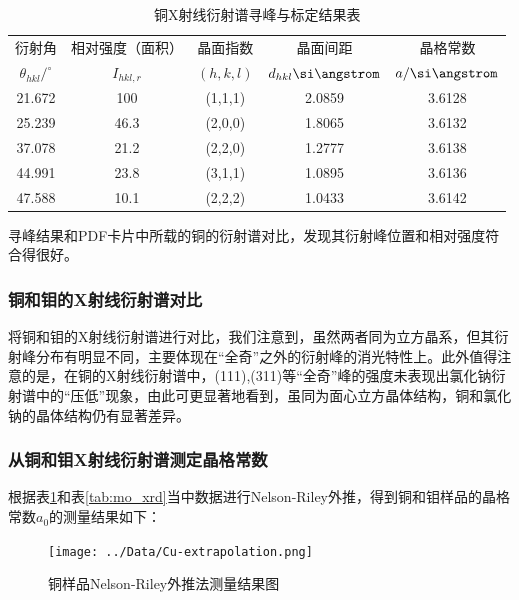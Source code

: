 \documentclass{thuemp}
\begin{document}
\begin{table}
    \centering
    \captionnamefont{\wuhao\bf\heiti}
    \captiontitlefont{\wuhao\bf\heiti}
    \caption{铜X射线衍射谱寻峰与标定结果表}
    \label{tab:cu_xrd}
    \liuhao
    \begin{tabular}{ccccc}
        \toprule
        衍射角 & 相对强度（面积）& 晶面指数 & 晶面间距 & 晶格常数 \\
        $\theta_{hkl}/^\circ$ & $I_{hkl,r}$ & $(h,k,l)$ & $d_{hkl}\text{\si\angstrom}$ & $a/\text{\si\angstrom}$\\
        \midrule
        21.672 &  100 & (1,1,1) & 2.0859 & 3.6128 \\
        25.239 & 46.3 & (2,0,0) & 1.8065 & 3.6132 \\
        37.078 & 21.2 & (2,2,0) & 1.2777 & 3.6138 \\
        44.991 & 23.8 & (3,1,1) & 1.0895 & 3.6136 \\
        47.588 & 10.1 & (2,2,2) & 1.0433 & 3.6142 \\
        \bottomrule
    \end{tabular}
\end{table}

寻峰结果和PDF卡片中所载的铜的衍射谱对比，发现其衍射峰位置和相对强度符合得很好。

\subsubsection{铜和钼的X射线衍射谱对比}

将铜和钼的X射线衍射谱进行对比，我们注意到，虽然两者同为立方晶系，但其衍射峰分布有明显不同，主要体现在“全奇”之外的衍射峰的消光特性上。此外值得注意的是，在铜的X射线衍射谱中，(111),(311)等“全奇”峰的强度未表现出氯化钠衍射谱中的“压低”现象，由此可更显著地看到，虽同为面心立方晶体结构，铜和氯化钠的晶体结构仍有显著差异。

\subsubsection{从铜和钼X射线衍射谱测定晶格常数}

根据表\ref{tab:cu_xrd}和表\ref{tab:mo_xrd}当中数据进行Nelson-Riley外推，得到铜和钼样品的晶格常数$a_0$的测量结果如下：

\begin{figure}[H]
    \centering
    \texttt{[image: ../Data/Cu-extrapolation.png]}
    \caption{铜样品Nelson-Riley外推法测量结果图}
    \label{fig:cu_xrd_extrapol}
\end{figure}
\end{document}
